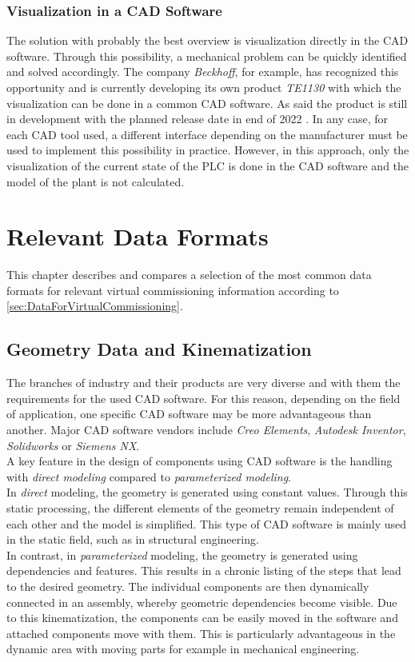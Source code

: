 \subsubsection{Visualization in a CAD Software}		%
    The solution with probably the best overview is visualization directly in the CAD software. Through this possibility, a mechanical problem can be quickly identified and solved accordingly. The company \textit{Beckhoff}, for example, has recognized this opportunity and is currently developing its own product \textit{TE1130} with which the visualization can be done in a common CAD software. As said the product is still in development with the planned release date in end of 2022 \cite{BeckhoffCadProduct}. In any case, for each CAD tool used, a different interface depending on the manufacturer must be used to implement this possibility in practice. However, in this approach, only the visualization of the current state of the PLC is done in the CAD software and the model of the plant is not calculated.

\section{Relevant Data Formats}    \label{sec:AvailableDataFormats}
    This chapter describes and compares a selection of the most common data formats for relevant virtual commissioning information according to \autoref{sec:DataForVirtualCommissioning}.

\subsection{Geometry Data and Kinematization}		%
	The branches of industry and their products are very diverse and with them the requirements for the used CAD software. For this reason, depending on the field of application, one specific CAD software may be more advantageous than another. Major CAD software vendors include \textit{Creo Elements}, \textit{Autodesk Inventor}, \textit{Solidworks} or \textit{Siemens NX}. \\ 
	A key feature in the design of components using CAD software is the handling with \textit{direct modeling} compared to \textit{parameterized modeling}. \\
	In \textit{direct} modeling, the geometry is generated using constant values. Through this static processing, the different elements of the geometry remain independent of each other and the model is simplified. This type of CAD software is mainly used in the static field, such as in structural engineering.  \\
	In contrast, in \textit{parameterized } modeling, the geometry is generated using dependencies and features. This results in a chronic listing of the steps that lead to the desired geometry. The individual components are then dynamically connected in an assembly, whereby geometric dependencies become visible. Due to this kinematization, the components can be easily moved in the software and attached components move with them. This is particularly advantageous in the dynamic area with moving parts for example in mechanical engineering.  \\
	
